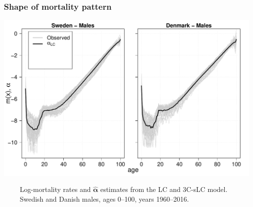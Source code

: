 \documentclass[12pt, xcolor=table]{beamer}  %
\begin{document}
\begin{frame}[noframenumbering]           
	\frametitle{Shape of mortality pattern}
	\begin{center}
		\includegraphics[scale=0.41]{Figures/Ch5/Alpha2}
	\end{center}

\vspace{-0.35cm}
\tiny{$\quad\quad$  Log-mortality rates and $\bm{\hat{\alpha}}$ estimates from the LC and 3C-sLC model. \\ $\quad\quad$ Swedish and Danish males, ages 0--100, years 1960--2016.}
	
\end{frame}
\end{document}
